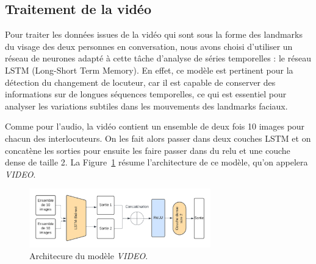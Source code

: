 \subsection{Traitement de la vidéo}

Pour traiter les données issues de la vidéo qui sont sous la forme des landmarks du visage des deux personnes en conversation,
nous avons choisi d'utiliser un réseau de neurones adapté à cette tâche d'analyse de séries temporelles : le réseau LSTM (Long-Short
Term Memory). En effet, ce modèle est pertinent pour la détection du changement de locuteur, car il est capable de conserver des
informations sur de longues séquences temporelles, ce qui est essentiel pour analyser les variations subtiles dans les mouvements
des landmarks faciaux. 

Comme pour l'audio, la vidéo contient un ensemble de deux fois 10 images pour chacun des interlocuteurs. On les fait alors passer
dans deux couches LSTM et on concatène les sorties pour ensuite les faire passer dans du relu et une couche dense de taille 2.
La Figure~\ref{fig: model_video} résume l'architecture de ce modèle, qu'on appelera \textit{VIDEO}.

\begin{figure}[H]
    \centering
    \includegraphics[width=0.7\textwidth]{image_model/model_video.png}
    \caption{Architecure du modèle \textit{VIDEO}.}
    \label{fig: model_video}
\end{figure}
